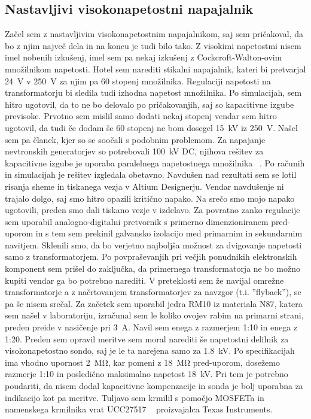 \documentclass[a4paper,twoside,openright,12pt,Slovene]{book}
\begin{document}
	\subsection{Nastavljivi visokonapetostni napajalnik}
	Začel sem z nastavljivim visokonapetostnim napajalnikom, saj sem pričakoval, da bo z njim največ dela in na koncu je tudi bilo tako. Z visokimi napetostmi nisem imel nobenih izkušenj, imel sem pa nekaj izkušenj z Cockcroft-Walton-ovim množilnikom napetosti. Hotel sem narediti stikalni napajalnik, kateri bi pretvarjal \SI{24}{\volt} v \SI{250}{\volt} za njim pa 60 stopenj množilnika. Regulaciji napetosti na transformatorju bi sledila tudi izhodna napetost množilnika. Po simulacijah, sem hitro ugotovil, da to ne bo delovalo po pričakovanjih, saj so kapacitivne izgube previsoke. Prvotno sem mislil samo dodati nekaj stopenj vendar sem hitro ugotovil, da tudi če dodam še 60 stopenj ne bom dosegel \SI{15}{\kilo\volt} iz \SI{250}{\volt}. Našel sem pa članek, kjer so se soočali s podobnim problemom. Za napajanje nevtronskih generatorjev so potrebovali \SI{100}{\kilo\volt} DC, njihova rešitev za kapacitivne izgube je uporaba paralelnega napetostnega množilnika  ~\cite{ParallelHighVoltageMultipliers}. Po računih in simulacijah je rešitev izgledala obetavno. Navdušen nad rezultati sem se lotil risanja sheme in tiskanega vezja v Altium Designerju. Vendar navdušenje ni trajalo dolgo, saj smo hitro opazili kritično napako. Na srečo smo mojo napako ugotovili, preden smo dali tiskano vezje v izdelavo. Za povratno zanko regulacije sem uporabil analogno-digitalni pretvornik s primerno dimenzioniranem pred-uporom in s tem sem prekinil galvansko izolacijo med primarnim in sekundarnim navitjem. Sklenili smo, da bo verjetno najboljša možnost za dvigovanje napetosti samo z transformatorjem. Po povpraševanjih pri večjih ponudnikih elektronskih komponent sem prišel do zaključka, da primernega transformatorja ne bo možno kupiti vendar ga bo potrebno narediti. V preteklosti sem že navijal omrežne transformatorje a z načrtovanjem transformatorjev za navzgor (t.i. ''flyback''), se pa še nisem srečal. Za začetek sem uporabil jedra RM10 iz materiala N87, katera sem našel v laboratoriju, izračunal sem le koliko ovojev rabim na primarni strani, preden preide v nasičenje pri \SI{3}{\ampere}. Navil sem enega z razmerjem 1:10 in enega z 1:20.
Preden sem opravil meritve sem moral narediti še napetostni delilnik za visokonapetostno sondo, saj je le ta narejena samo za \SI{1.8}{\kilo\volt}. Po specifikacijah ima vhodno upornost \SI{2}{\mega\ohm}, kar pomeni z \SI{18}{\mega\ohm} pred-uporom, dosežemo razmerje 1:10 in posledično maksimalno napetost \SI{18}{\kilo\volt}. Pri tem je potrebno poudariti, da nisem dodal kapacitivne kompenzacije in sonda je bolj uporabna za indikacijo kot pa meritve. Tuljavo sem krmilil s pomočjo MOSFETa in namenskega krmilnika vrat UCC27517 ~\cite{TI:UCC27517} proizvajalca Texas Instruments. 
\end{document}
